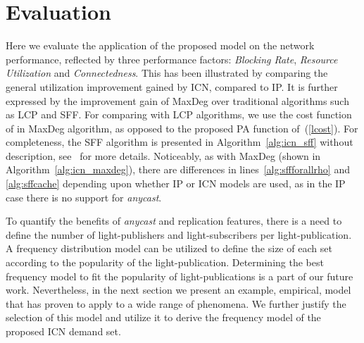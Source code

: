 \documentclass[journal]{IEEEtran}
\begin{document}
\section{Evaluation}\label{sec:eva}
Here we evaluate the application of the proposed model on the network performance, reflected by three performance factors: \emph{Blocking Rate}, \emph{Resource Utilization} and \emph{Connectedness}. This has been illustrated by comparing the general utilization improvement gained by ICN, compared to IP. It is further expressed by the improvement gain of MaxDeg over traditional algorithms such as LCP and SFF. For comparing with LCP algorithms, we use the cost function of \cite{ozd:rwa} in MaxDeg algorithm, as opposed to the proposed PA function of~(\ref{lcost}).
For completeness, the SFF algorithm is presented in
Algorithm~\ref{alg:icn_sff} without description, see~\cite{dij:rwa}
for more details. Noticeably, as with MaxDeg (shown in
Algorithm~\ref{alg:icn_maxdeg}), there are differences in
lines~\ref{alg:sffforallrho} and \ref{alg:sffcache} depending upon
whether IP or ICN models are used, as in the IP case there is no support for
\emph{anycast}.
\begin{algorithm}[t]
\caption{}
\label{alg:icn_sff}
\begin{algorithmic}[1]
\STATE 
	\FORALL {}
		\FORALL{}
			\STATE 
             \label{alg:sffforallrho}
				\STATE
				\STATE
				\IF{}
					\STATE
				\ENDIF
			\ENDFOR
			\IF {}
				\STATE 
				\IF{}
					\FORALL {}
						\STATE 
						\IF{}
							\STATE
						\ENDIF
					\ENDFOR
					\STATE
          \STATE \lIf{} 
					{
					 
					} \label{alg:sffcache}
				\ELSE
					\STATE
				\ENDIF
			\ELSE
				\STATE
			\ENDIF
		\ENDFOR
	\ENDFOR
\end{algorithmic}
\end{algorithm}

To quantify the benefits of \emph{anycast} and replication features, there is a need to define the number of light-publishers and light-subscribers per light-publication. A frequency distribution model can be utilized to define the size of each set according to the popularity of the light-publication. Determining the best frequency model to fit the popularity of light-publications is a part of our future work. Nevertheless, in the next section we present an example, empirical, model that has proven to apply to a wide range of phenomena. We further justify the selection of this model and utilize it to derive the frequency model of the proposed ICN demand set.
\end{document}
